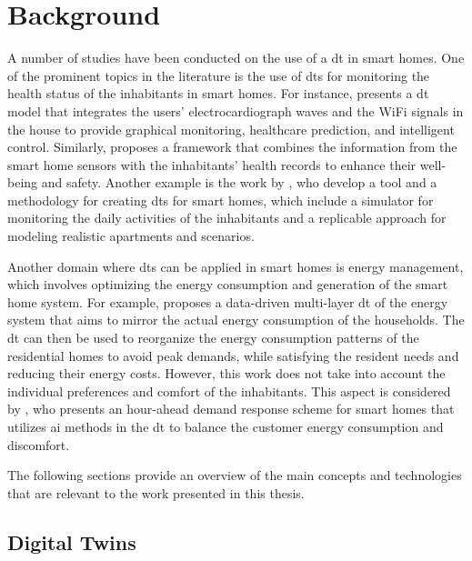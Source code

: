 \chapter{Background}\label{ch:background}

A number of studies have been conducted on the use of a \acrfull{dt} in smart homes. One of the prominent topics in the literature is the use of \acrshort{dt}s for monitoring the health status of the inhabitants in smart homes. For instance, \textcite{chenDigitalTwinEmpowered2023} presents a \acrshort{dt} model that integrates the users' electrocardiograph waves and the WiFi signals in the house to provide graphical monitoring, healthcare prediction, and intelligent control. Similarly, \textcite{shoukatSmartHomeEnhanced2023} proposes a framework that combines the information from the smart home sensors with the inhabitants' health records to enhance their well-being and safety. Another example is the work by \textcite{bouchabouSmartHomeDigital2023}, who develop a tool and a methodology for creating \acrshort{dt}s for smart homes, which include a simulator for monitoring the daily activities of the inhabitants and a replicable approach for modeling realistic apartments and scenarios.

Another domain where \acrshort{dt}s can be applied in smart homes is energy management, which involves optimizing the energy consumption and generation of the smart home system. For example, \textcite{fathyDigitalTwinDrivenDecision2021} proposes a data-driven multi-layer \acrshort{dt} of the energy system that aims to mirror the actual energy consumption of the households. The \acrshort{dt} can then be used to reorganize the energy consumption patterns of the residential homes to avoid peak demands, while satisfying the resident needs and reducing their energy costs. However, this work does not take into account the individual preferences and comfort of the inhabitants. This aspect is considered by \textcite{huangMachineLearningbasedDemand2023}, who presents an hour-ahead demand response scheme for smart homes that utilizes \acrshort{ai} methods in the \acrshort{dt} to balance the customer energy consumption and discomfort.

The following sections provide an overview of the main concepts and technologies that are relevant to the work presented in this thesis.

\newpage

\section{Digital Twins}

